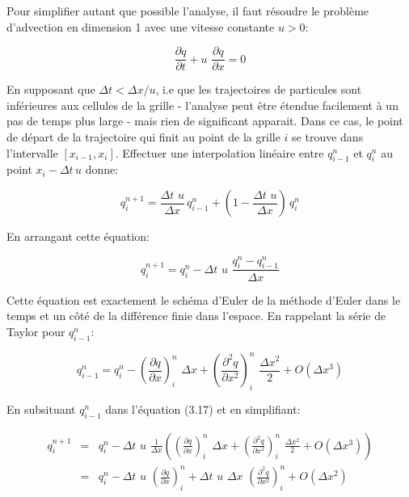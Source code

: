 \documentclass[11pt]{report}
\begin{document}
Pour simplifier autant que possible l'analyse, il faut résoudre le problème d'advection en dimension 1 avec une vitesse constante $ u > 0 $:

\begin{equation}
\frac{\partial q}{\partial t} + u \,\, \frac{\partial q}{\partial x} = 0
\end{equation}

En supposant que $ \Delta t < \Delta x/u $, i.e que les trajectoires de particules sont inférieures aux cellules de la grille - l'analyse peut être étendue facilement à un pas de temps plus large - mais rien de significant apparait. Dans ce cas, le point de départ de la trajectoire  qui finit au point de la grille $i$ se trouve dans l'intervalle $[x_{i-1}, x_i]$. Effectuer une interpolation linéaire entre $q_{i-1}^n$ et $q_i^n$ au point $x_i - \Delta t \, u$ donne:

\begin{equation}
q_i^{n+1} = \frac{\Delta t \,\, u}{ \Delta x} \, q_{i-1}^n + (1 - \frac{\Delta t \,\, u}{ \Delta x}) \, q_i^n
\end{equation}

En arrangant cette équation:

\begin{equation}
q_i^{n+1} = q_i^n - \Delta t \,\, u \,\, \frac{q_i^n - q_{i-1}^n }{\Delta x}
\end{equation}

Cette équation est exactement le schéma d'Euler de la méthode d'Euler dans le temps et un côté de la différence finie dans l'espace.
En rappelant la série de Taylor pour $q_{i-1}^n$:

\begin{equation}
q_{i-1}^n = q_i^n - \left(\frac{\partial q}{\partial x}\right)_i^n \,\, \Delta x + \left(\frac{\partial^2 q}{\partial x^2}\right)_i^n \,\, \frac{\Delta x^2}{2} + O(\Delta x^3)
\end{equation} 

En subsituant $q_{i-1}^n$ dans l'équation  (3.17) et en simplifiant:

\begin{eqnarray}
q_i^{n+1} & = & q_i^n - \Delta t \,\,u \,\, \frac{1}{\Delta x} \left( \left(\frac{\partial q}{\partial x}\right)_i^n \,\, \Delta x + \left(\frac{\partial^2 q}{\partial x^2}\right)_i^n \,\, \frac{\Delta x^2}{2} + O(\Delta x^3) \right) \\
& = & q_i^n - \Delta t \,\,u \,\,\left(\frac{\partial q}{\partial x}\right)_i^n + \Delta t \,\,u \,\,\Delta x \,\, \left(\frac{\partial^2 q}{\partial x^2}\right)_i^n + O(\Delta x^2	)
\end{eqnarray}
\end{document}
